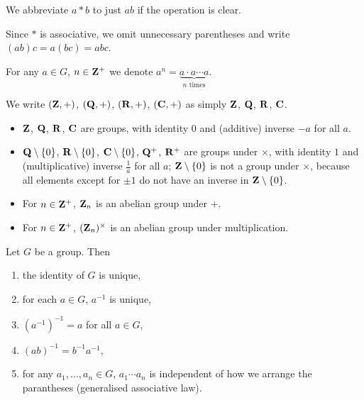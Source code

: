 \begin{notation}
We abbreviate $a\ast b$ to just $ab$ if the operation is clear.
\end{notation}

\begin{notation}
Since $\ast$ is associative, we omit unnecessary parentheses and write $(ab)c=a(bc)=abc$.
\end{notation}

\begin{notation}
For any $a\in G$, $n\in\mathbf Z^+$ we denote $a^n=\underbrace{a\cdot a\cdots a}_\text{$n$ times}$.
\end{notation}

\begin{notation}
We write $(\mathbf Z,+)$, $(\mathbf Q,+)$, $(\mathbf R,+)$, $(\mathbf C,+)$ as simply $\mathbf Z$, $\mathbf Q$, $\mathbf R$, $\mathbf C$.
\end{notation}

\begin{example}
\begin{itemize}
\item $\mathbf Z$, $\mathbf Q$, $\mathbf R$, $\mathbf C$ are groups, with identity $0$ and (additive) inverse $-a$ for all $a$.
\item $\mathbf Q\setminus\{0\}$, $\mathbf R\setminus\{0\}$, $\mathbf C\setminus\{0\}$, $\mathbf Q^+$, $\mathbf R^+$ are groups under $\times$, with identity $1$ and (multiplicative) inverse $\frac{1}{a}$ for all $a$; $\mathbf Z\setminus\{0\}$ is not a group under $\times$, because all elements except for $\pm1$ do not have an inverse in $\mathbf Z\setminus\{0\}$.
\item For $n\in\mathbf Z^+$, $\mathbf Z_n$ is an abelian group under $+$.
\item For $n\in\mathbf Z^+$, $(\mathbf Z_n)^\times$ is an abelian group under multiplication.
\end{itemize}
\end{example}

\begin{proposition}
Let $G$ be a group. Then
\begin{enumerate}[label=(\roman*)]
\item the identity of $G$ is unique,
\item for each $a\in G$, $a^{-1}$ is unique,
\item $(a^{-1})^{-1}=a$ for all $a\in G$,
\item $(ab)^{-1}=b^{-1}a^{-1}$,
\item for any $a_1,\dots,a_n\in G$, $a_1\cdots a_n$ is independent of how we arrange the parantheses (generalised associative law).
\end{enumerate}
\end{proposition}

